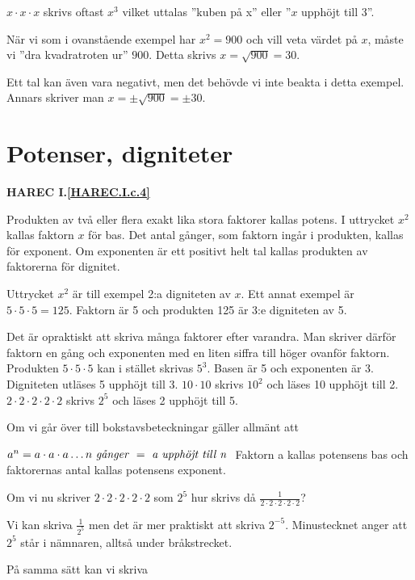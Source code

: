 \(x \cdot x \cdot x\) skrivs oftast \(x^3\) vilket uttalas ''kuben på x''
eller ''\(x\) upphöjt till 3''.

När vi som i ovanstående exempel har \(x^2 = 900\) och vill veta värdet på
\(x\), måste vi ''dra kvadratroten ur'' \(900\).
Detta skrivs \(x = \sqrt{900} = 30\).

Ett tal kan även vara negativt, men det behövde vi inte beakta i detta exempel.
Annars skriver man \(x = \pm \sqrt{900} = \pm 30\).

\section{Potenser, digniteter}
\textbf{HAREC I.\ref{HAREC.I.c.4}\label{myHAREC.I.c.4}}
\label{potenser}

Produkten av två eller flera exakt lika stora faktorer kallas potens.
I uttrycket \(x^2\) kallas faktorn \(x\) för bas. Det antal gånger, som faktorn
ingår i produkten, kallas för exponent.
Om exponenten är ett positivt helt tal kallas produkten av faktorerna för
dignitet.

Uttrycket \(x^2\) är till exempel 2:a digniteten av \(x\).
Ett annat exempel är \(5 \cdot 5 \cdot 5 = 125\).
Faktorn är 5 och produkten 125 är 3:e digniteten av 5.

Det är opraktiskt att skriva många faktorer efter varandra.
Man skriver därför faktorn en gång och exponenten med en liten siffra till
höger ovanför faktorn.
Produkten \(5 \cdot 5 \cdot 5\) kan i stället skrivas \(5^3\).
Basen är 5 och exponenten är 3.
Digniteten utläses 5 upphöjt till 3.
\(10 \cdot 10\) skrivs \(10^2\) och läses 10 upphöjt till 2.
\(2 \cdot 2 \cdot 2 \cdot 2 \cdot 2\) skrivs \(2^5\) och läses 2 upphöjt till 5.

Om vi går över till bokstavsbeteckningar gäller allmänt att

\(a^n= a \cdot a \cdot a \ldots n \textrm{ \emph{g{\aa}nger} } = \textrm{ \emph{a
  upphöjt till n} }\) 
Faktorn a kallas potensens bas och faktorernas antal kallas potensens exponent.

Om vi nu skriver \(2 \cdot 2 \cdot 2 \cdot 2 \cdot 2\) som \(2^5\) hur skrivs då
\(\frac{1}{2 \cdot 2 \cdot 2 \cdot 2 \cdot 2}\)?

Vi kan skriva \(\frac{1}{2^5}\) men det är mer praktiskt att skriva \(2^{-5}\).
Minustecknet anger att \(2^5\) står i nämnaren, alltså under bråkstrecket.

På samma sätt kan vi skriva

